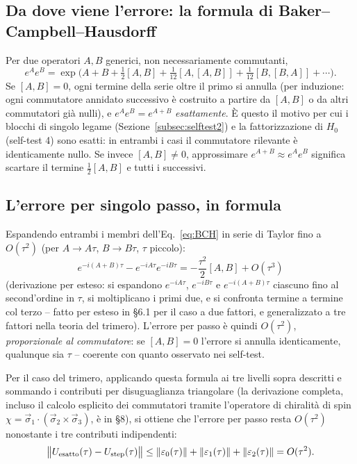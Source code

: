 \documentclass[11pt,a4paper]{article}
\begin{document}
\subsection{Da dove viene l'errore: la formula di Baker--Campbell--Hausdorff}

Per due operatori $A,B$ generici, non necessariamente commutanti,
\begin{equation}
e^Ae^B = \exp\!\Big(A+B+\tfrac12[A,B]+\tfrac1{12}[A,[A,B]]+\tfrac1{12}[B,[B,A]]+\cdots\Big).
\label{eq:BCH}
\end{equation}
Se $[A,B]=0$, ogni termine della serie oltre il primo si annulla (per
induzione: ogni commutatore annidato successivo è costruito a partire da
$[A,B]$ o da altri commutatori già nulli), e $e^Ae^B=e^{A+B}$
\emph{esattamente}. È questo il motivo per cui i blocchi di singolo
legame (Sezione~\ref{subsec:selftest2}) e la fattorizzazione di $H_0$
(self-test 4) sono esatti: in entrambi i casi il commutatore rilevante è
identicamente nullo. Se invece $[A,B]\neq0$, approssimare
$e^{A+B}\approx e^Ae^B$ significa scartare il termine $\tfrac12[A,B]$ e
tutti i successivi.

\subsection{L'errore per singolo passo, in formula}

Espandendo entrambi i membri dell'Eq.~\eqref{eq:BCH} in serie di Taylor
fino a $O(\tau^2)$ (per $A\to A\tau$, $B\to B\tau$, $\tau$ piccolo):
\begin{equation}
e^{-i(A+B)\tau} - e^{-iA\tau}e^{-iB\tau} = -\frac{\tau^2}2[A,B] + O(\tau^3)
\label{eq:2term-error}
\end{equation}
(derivazione per esteso: si espandono $e^{-iA\tau}$, $e^{-iB\tau}$ e
$e^{-i(A+B)\tau}$ ciascuno fino al second'ordine in $\tau$, si moltiplicano
i primi due, e si confronta termine a termine col terzo -- fatto per
esteso in \texttt{} \S6.1 per il
caso a due fattori, e generalizzato a tre fattori nella teoria del
trimero). L'errore per passo è quindi $O(\tau^2)$, \emph{proporzionale al
commutatore}: se $[A,B]=0$ l'errore si annulla identicamente, qualunque
sia $\tau$ -- coerente con quanto osservato nei self-test.

Per il caso del trimero, applicando questa formula ai tre livelli
sopra descritti e sommando i contributi per disuguaglianza triangolare
(la derivazione completa, incluso il calcolo esplicito dei commutatori
tramite l'operatore di chiralità di spin
$\chi=\vec\sigma_1\cdot(\vec\sigma_2\times\vec\sigma_3)$, è in
\texttt{} \S8), si ottiene
che l'errore per passo resta $O(\tau^2)$ nonostante i tre contributi
indipendenti:
\begin{equation}
\big\|U_{\rm esatto}(\tau)-U_{\rm step}(\tau)\big\| \le \|\varepsilon_0(\tau)\|+\|\varepsilon_1(\tau)\|+\|\varepsilon_2(\tau)\| = O(\tau^2).
\label{eq:total-step-error}
\end{equation}
\end{document}
